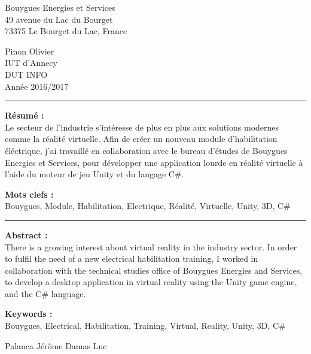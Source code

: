 \documentclass[a4paper]{article}
\begin{document}
    \newpage 
    \pagestyle{empty}
    
    \normalsize
    \noindent
    \begin{minipage}{.5\textwidth}
        Bouygues Energies et Services \\
        49 avenue du Lac du Bourget \\
        73375 Le Bourget du Lac, France
    \end{minipage}
    \begin{minipage}{.5\textwidth}
    \begin{flushright}
        Pinon Olivier \\
        IUT d'Annecy \\
        DUT INFO \\
        Année 2016/2017 \\
    \end{flushright}
    \end{minipage}

    \vspace{10pt}
    \noindent\rule{0.725\paperwidth}{0.4pt}
    
    \vfill 
    \begin{flushleft}
    \huge \textbf{Résumé : } \\
    \vspace{10pt}
    \normalsize Le secteur de l'industrie s'intéresse de plus en plus aux solutions modernes comme la réalité virtuelle. Afin de créer un nouveau module d'habilitation éléctrique, j'ai travaillé en collaboration avec le bureau d'études de Bouygues Energies et Services, pour développer une application lourde en réalité virtuelle à l'aide du moteur de jeu Unity et du langage C\#. \\
    \end{flushleft}
    
    \vfill 
    \begin{flushleft}
    \huge \textbf{Mots clefs : } \vspace{2pt} \\
    \vspace{10pt}
    \normalsize Bouygues, Module, Habilitation, Electrique, Réalité, Virtuelle, Unity, 3D, C\#
    \end{flushleft}

    \noindent\rule{0.725\paperwidth}{0.4pt}
    
    \vfill 
    \begin{flushleft}
    \huge \textbf{Abstract : } \\
    \vspace{10pt}
    \normalsize There is a growing interest about virtual reality in the industry sector. In order to fulfil the need of a new electrical habilitation training, I worked in collaboration with the technical studies office of Bouygues Energies and Services, to develop a desktop application in virtual reality using the Unity game engine, and the C\# language.
    \end{flushleft}
    
    \vfill 
    \begin{flushleft}
    \huge \textbf{Keywords : } \\
    \vspace{10pt}
    \normalsize Bouygues, Electrical, Habilitation, Training, Virtual, Reality, Unity, 3D, C\#
    \end{flushleft}

	\vfill
    Palanca Jérôme \hfill Damas Luc
\end{document}
